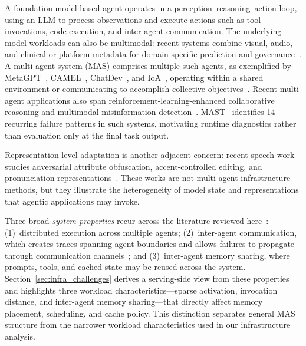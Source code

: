 A foundation model-based agent operates in a perception--reasoning--action loop, using an LLM to process observations and execute actions such as tool invocations, code execution, and inter-agent communication. The underlying model workloads can also be multimodal: recent systems combine visual, audio, and clinical or platform metadata for domain-specific prediction and governance~\cite{wang-etal-2025-reasoning-enhanced,10.1145/3711896.3737195,xu2026mobifusiondrm}. A multi-agent system (MAS) comprises multiple such agents, as exemplified by MetaGPT~\cite{metagpt2024}, CAMEL~\cite{camel2023}, ChatDev~\cite{chatdev2024}, and IoA~\cite{ioa2025}, operating within a shared environment or communicating to accomplish collective objectives~\cite{li2024, wang2026classical}. Recent multi-agent applications also span reinforcement-learning-enhanced collaborative reasoning and multimodal misinformation detection~\cite{li2026draftrl,li2026retrievalaugmentedfakenews}. MAST~\cite{mast2025} identifies 14 recurring failure patterns in such systems, motivating runtime diagnostics rather than evaluation only at the final task output.

Representation-level adaptation is another adjacent concern: recent speech work studies adversarial attribute obfuscation, accent-controlled editing, and pronunciation representations~\cite{11249000,qu2026partialaccentcontroleditingfrozen,qu2026phonemeawarepronunciationrepresentationsl2english}. These works are not multi-agent infrastructure methods, but they illustrate the heterogeneity of model state and representations that agentic applications may invoke.

Three broad \emph{system properties} recur across the literature reviewed here~\cite{understandingmas2026}: (1)~distributed execution across multiple agents; (2)~inter-agent communication, which creates traces spanning agent boundaries and allows failures to propagate through communication channels~\cite{famas2025, traceelephant2026}; and (3)~inter-agent memory sharing, where prompts, tools, and cached state may be reused across the system. Section~\ref{sec:infra_challenges} derives a serving-side view from these properties and highlights three workload characteristics---sparse activation, invocation distance, and inter-agent memory sharing---that directly affect memory placement, scheduling, and cache policy. This distinction separates general MAS structure from the narrower workload characteristics used in our infrastructure analysis.

